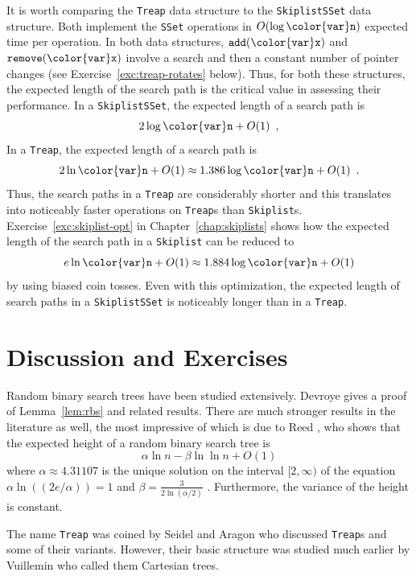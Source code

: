 \documentclass[10pt]{book}
\newcommand{\chapref}[1]{Chapter~\ref{chap:#1}}
\theoremstyle{plain}
\newcommand{\lemref}[1]{Lemma~\ref{lem:#1}}
\theoremstyle{definition}
\newcommand{\excref}[1]{Exercise~\ref{exc:#1}}
\begin{document}
It is worth comparing the \texttt{Treap} data structure to the \texttt{SkiplistSSet}
data structure.  Both implement the \texttt{SSet} operations in $O(\log \ensuremath{\mathtt{{\color{var}n}}})$
expected time per operation.  In both data structures, \ensuremath{\mathtt{add({\color{var}x})}} and
\ensuremath{\mathtt{remove({\color{var}x})}} involve a search and then a constant number of pointer changes
(see \excref{treap-rotates} below).  Thus, for both these structures,
the expected length of the search path is the critical value in assessing
their performance.  In a \texttt{SkiplistSSet}, the expected length of a search
path is
\[
     2\log \ensuremath{\mathtt{{\color{var}n}}} + O(1) \enspace ,
\]
In a \texttt{Treap}, the expected length of a search path is 
\[
    2\ln \ensuremath{\mathtt{{\color{var}n}}} +O(1) \approx 1.386\log \ensuremath{\mathtt{{\color{var}n}}}  + O(1) \enspace .
\]
Thus, the search paths in a \texttt{Treap} are considerably shorter and this
translates into noticeably faster operations on \texttt{Treap}s than \texttt{Skiplist}s.
\excref{skiplist-opt} in \chapref{skiplists} shows how the
expected length of the search path in a \texttt{Skiplist} can be reduced to
\[
     e\ln \ensuremath{\mathtt{{\color{var}n}}} + O(1) \approx 1.884\log \ensuremath{\mathtt{{\color{var}n}}} + O(1) 
\]
by using biased coin tosses.  Even with this optimization, the expected
length of search paths in a \texttt{SkiplistSSet} is noticeably longer than in
a \texttt{Treap}.

\section{Discussion and Exercises}

Random binary search trees have been studied extensively.  Devroye
\cite{d88} gives a proof of \lemref{rbs} and related results. There are
much stronger results in the literature as well, the most impressive
of which is due to Reed \cite{r03}, who shows that the expected height
of a random binary search tree is
\[
  \alpha\ln n - \beta\ln\ln n + O(1)
\]
where $\alpha\approx4.31107$ is the unique solution on the
interval $[2,\infty)$ of the equation $\alpha\ln((2e/\alpha))=1$ and
$\beta=\frac{3}{2\ln(\alpha/2)}$ .  Furthermore, the variance of the
height is constant.

The name \texttt{Treap} was coined by Seidel and Aragon \cite{as96} who discussed
\texttt{Treap}s and some of their variants.  However, their basic structure was
studied much earlier by Vuillemin \cite{v80} who called them Cartesian
trees.
\end{document}
